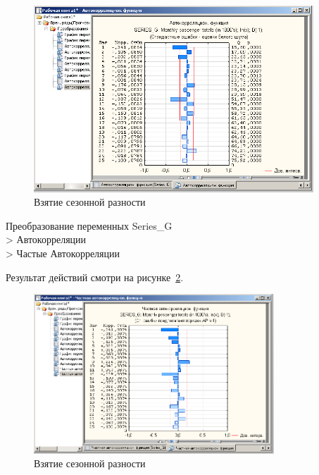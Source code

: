 \begin{figure}[!h]
  \centering

  \includegraphics[height=7cm]
  {inc/9.PNG}

  \caption{Взятие сезонной разности}

  \label{fig:9}
\end{figure}


\newpage

Преобразование переменных Series\_G\\
> Автокорреляции\\
> Частые Автокорреляции

Результат действий смотри на рисунке~\ref{fig:10}.

\begin{figure}[!h]
  \centering

  \includegraphics[height=6cm]
  {inc/10.PNG}

  \caption{Взятие сезонной разности}

  \label{fig:10}
\end{figure}


